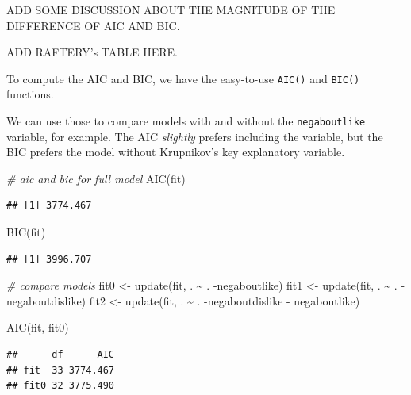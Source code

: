 \documentclass[
]{book}
\newenvironment{Shaded}{\begin{snugshade}}{\end{snugshade}}
\newcommand{\CommentTok}[1]{\textcolor[rgb]{0.56,0.35,0.01}{\textit{#1}}}
\newcommand{\FunctionTok}[1]{\textcolor[rgb]{0.00,0.00,0.00}{#1}}
\newcommand{\NormalTok}[1]{#1}
\newcommand{\OtherTok}[1]{\textcolor[rgb]{0.56,0.35,0.01}{#1}}
\newcommand{\SpecialCharTok}[1]{\textcolor[rgb]{0.00,0.00,0.00}{#1}}
\begin{document}
ADD SOME DISCUSSION ABOUT THE MAGNITUDE OF THE DIFFERENCE OF AIC AND BIC.

ADD RAFTERY's TABLE HERE.

To compute the AIC and BIC, we have the easy-to-use \texttt{AIC()} and \texttt{BIC()} functions.

We can use those to compare models with and without the \texttt{negaboutlike} variable, for example. The AIC \emph{slightly} prefers including the variable, but the BIC prefers the model without Krupnikov's key explanatory variable.

\begin{Shaded}
\begin{Highlighting}[]
\CommentTok{\# aic and bic for full model}
\FunctionTok{AIC}\NormalTok{(fit)}
\end{Highlighting}
\end{Shaded}

\begin{verbatim}
## [1] 3774.467
\end{verbatim}

\begin{Shaded}
\begin{Highlighting}[]
\FunctionTok{BIC}\NormalTok{(fit)}
\end{Highlighting}
\end{Shaded}

\begin{verbatim}
## [1] 3996.707
\end{verbatim}

\begin{Shaded}
\begin{Highlighting}[]
\CommentTok{\# compare models}
\NormalTok{fit0 }\OtherTok{\textless{}{-}} \FunctionTok{update}\NormalTok{(fit, . }\SpecialCharTok{\textasciitilde{}}\NormalTok{ . }\SpecialCharTok{{-}}\NormalTok{negaboutlike)}
\NormalTok{fit1 }\OtherTok{\textless{}{-}} \FunctionTok{update}\NormalTok{(fit, . }\SpecialCharTok{\textasciitilde{}}\NormalTok{ . }\SpecialCharTok{{-}}\NormalTok{negaboutdislike)}
\NormalTok{fit2 }\OtherTok{\textless{}{-}} \FunctionTok{update}\NormalTok{(fit, . }\SpecialCharTok{\textasciitilde{}}\NormalTok{ . }\SpecialCharTok{{-}}\NormalTok{negaboutdislike }\SpecialCharTok{{-}}\NormalTok{ negaboutlike)}


\FunctionTok{AIC}\NormalTok{(fit, fit0)}
\end{Highlighting}
\end{Shaded}

\begin{verbatim}
##      df      AIC
## fit  33 3774.467
## fit0 32 3775.490
\end{verbatim}
\end{document}
